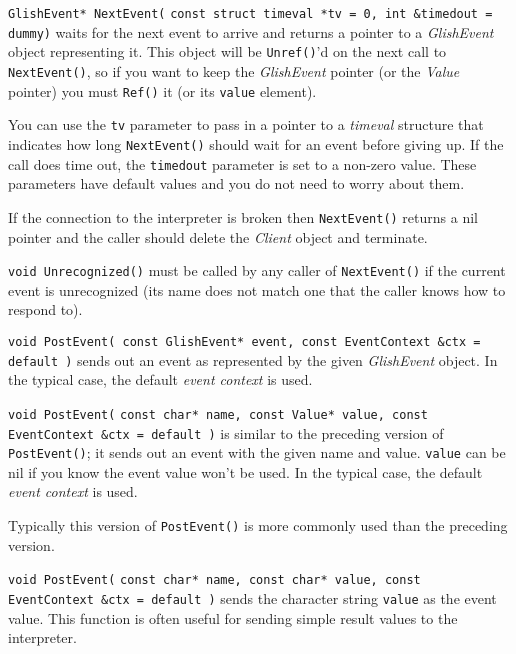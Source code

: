 \begin{sloppy}
\begin{list}{}{}
\item[{\tt GlishEvent* NextEvent(}] {\tt const struct timeval \verb+*tv = 0+, int \&timedout = dummy)}
waits for the next event to arrive
and returns a pointer to a {\em GlishEvent} object representing it.
This object will be {\tt Unref()}'d on the next call to {\tt NextEvent()},
so if you want to keep the {\em GlishEvent} pointer (or the {\em Value}
pointer) you must {\tt Ref()} it (or its {\tt value} element).

You can use the {\tt tv} parameter to pass in a pointer to a {\em timeval}
structure that indicates how long {\tt NextEvent()} should wait for an
event before giving up. If the call does time out, the {\tt timedout}
parameter is set to a non-zero value. These parameters have default
values and you do not need to worry about them.

If the connection to the interpreter
is broken then {\tt NextEvent()}
returns a nil pointer and the caller should delete the {\em Client} object
and terminate.

\item[{\tt void Unrecognized()}] must
be called by any caller of
{\tt NextEvent()} if the current event is unrecognized (its name does
not match one that the caller knows how to respond to).

\item[{\tt void PostEvent( const GlishEvent* event, const EventContext \&ctx = default )}] sends
out an event as represented by the given {\em GlishEvent} object. In the typical
case, the default {\em event context} is used.

\item[{\tt void PostEvent(}] {\tt const char* name, const Value* value, const EventContext \&ctx = default )}
is similar to the preceding version of {\tt PostEvent()}; it sends out an
event with the given name and value.  {\tt value} can be nil if you know
the event value won't be used. In the typical case, the default
{\em event context} is used.

Typically this version of {\tt PostEvent()} is more commonly used than the
preceding version.

\item[{\tt void PostEvent(}] {\tt const char* name, const char* value,
const EventContext \&ctx = default )} sends the character string
{\tt value} as the event value. This function is often useful for sending
simple result values to the interpreter.


\end{list}
\end{sloppy}
